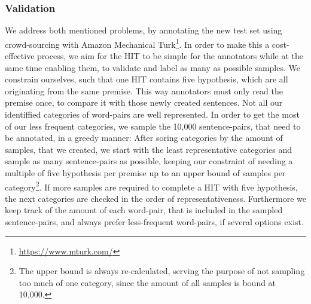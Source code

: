 \subsubsection{Validation}
We address both mentioned problems, by annotating the new test set using crowd-sourcing with Amazon Mechanical Turk\footnote{\href{https://www.mturk.com/}{https://www.mturk.com/}}. In order to make this a cost-effective process, we aim for the \ac{HIT} to be simple for the annotators while at the same time enabling them, to validate and label as many as possible samples. We constrain ourselves, such that one \ac{HIT} contains five hypothesis, which are all originating from the same premise. This way annotators must only read the premise once, to compare it with those newly created sentences. Not all our identiffied categories of word-pairs are well represented. In order to get the most of our less frequent categories, we sample the 10,000 sentence-pairs, that need to be annotated, in a greedy manner: After soring categories by the amount of samples, that we created, we start with the least representative categories and sample as many sentence-pairs as possible, keeping our constraint of needing a multiple of five hypothesis per premise up to an upper bound of samples per category\footnote{The upper bound is always re-calculated, serving the purpose of not sampling too much of one category, since the amount of all samples is bound at 10,000.}. If more samples are required to complete a \ac{HIT} with five hypothesis, the next categories are checked in the order of representativeness. Furthermore we keep track of the amount of each word-pair, that is included in the sampled sentence-pairs, and always prefer less-frequent word-pairs, if several options exist.
